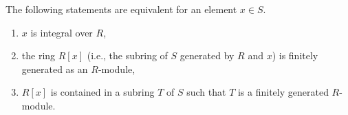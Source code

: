 The following statements are equivalent for an element $x \in S$.
\begin{enumerate}[label=(\roman*)]
	\item $x$ is integral over $R$,
	\item the ring $R[x]$ (i.e., the subring of $S$ generated by $R$ and $x$) is
		finitely generated as an $R$-module,
	\item $R[x]$ is contained in a subring $T$ of $S$ such that $T$ is a finitely
		generated $R$-module.
\end{enumerate}
